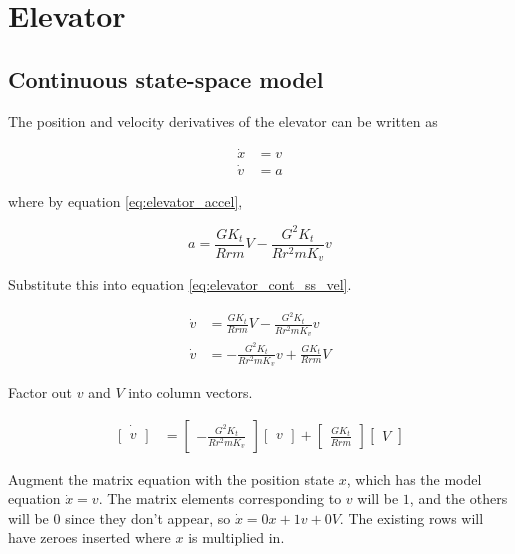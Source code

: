 \section{Elevator}
\label{sec:ss_model_elevator}

\subsection{Continuous state-space model}

The position and velocity derivatives of the elevator can be written as

\begin{align}
  \dot{x} &= v \label{eq:elevator_cont_ss_pos} \\
  \dot{v} &= a \label{eq:elevator_cont_ss_vel}
\end{align}

where by equation \eqref{eq:elevator_accel},

\begin{equation*}
  a = \frac{GK_t}{Rrm} V - \frac{G^2 K_t}{Rr^2 m K_v} v
\end{equation*}

Substitute this into equation \eqref{eq:elevator_cont_ss_vel}.

\begin{align}
  \dot{v} &= \frac{GK_t}{Rrm} V - \frac{G^2 K_t}{Rr^2 m K_v} v \nonumber \\
  \dot{v} &= -\frac{G^2 K_t}{Rr^2 m K_v} v + \frac{GK_t}{Rrm} V
\end{align}

Factor out $v$ and $V$ into column vectors.

\begin{align*}
  \dot{\begin{bmatrix}
    v
  \end{bmatrix}} &=
  \begin{bmatrix}
    -\frac{G^2 K_t}{Rr^2 m K_v}
  \end{bmatrix}
  \begin{bmatrix}
    v
  \end{bmatrix} +
  \begin{bmatrix}
    \frac{GK_t}{Rrm}
  \end{bmatrix}
  \begin{bmatrix}
    V
  \end{bmatrix}
\end{align*}

Augment the matrix equation with the position state $x$, which has the model
equation $\dot{x} = v$. The matrix elements corresponding to $v$ will be $1$,
and the others will be $0$ since they don't appear, so $\dot{x} = 0x + 1v + 0V$.
The existing rows will have zeroes inserted where $x$ is multiplied in.

